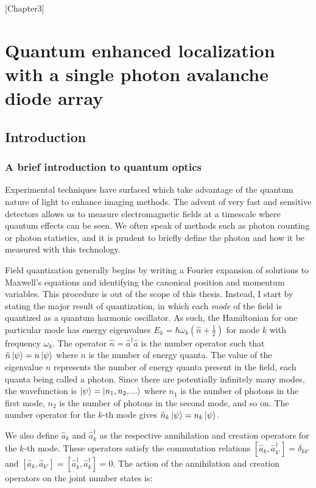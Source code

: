 [Chapter3]

\chapter{Quantum enhanced localization with a single photon avalanche diode array}

\section{Introduction}

\subsection{A brief introduction to quantum optics}

Experimental techniques have surfaced which take advantage of the quantum nature of light to enhance imaging methods. The advent of very fast and sensitive detectors allows us to measure electromagnetic fields at a timescale where quantum effects can be seen. We often speak of methods such as photon counting or photon statistics, and it is prudent to briefly define the photon and how it be measured with this technology.

Field quantization generally begins by writing a Fourier expansion of solutions to Maxwell's equations and identifying the canonical position and momentum variables. This procedure is out of the scope of this thesis. Instead, I start by stating the major result of quantization, in which each \emph{mode} of the field is quantized as a quantum harmonic oscillator. As such, the Hamiltonian for one particular mode has energy eigenvalues $E_{k} = \hbar\omega_{k}(\hat{n} + \frac{1}{2})$ for mode $k$ with frequency $\omega_{k}$. The operator $\hat{n}=\hat{a}^{\dagger}\hat{a}$ is the number operator such that $\hat{n}\ket{\psi} = n\ket{\psi}$ where $n$ is the number of energy quanta. The value of the eigenvalue $n$ represents the number of energy quanta present in the field, each quanta being called a photon. Since there are potentially infinitely many modes, the wavefunction is $\ket{\psi} = \ket{n_{1},n_{2},...}$ where $n_1$ is the number of photons in the first mode, $n_2$ is the number of photons in the second mode, and so on. The number operator for the $k$-th mode gives $\hat{n}_k\ket{\psi} = n_{k}\ket{\psi}$. 

We also define $\hat{a}_k$ and $\hat{a}_k^\dagger$ as the respective annihilation and creation operators for the $k$-th mode. These operators satisfy the commutation relations $[\hat{a}_k, \hat{a}_{k'}^\dagger] = \delta_{kk'}$ and $[\hat{a}_k, \hat{a}_{k'}] = [\hat{a}_k^\dagger, \hat{a}_k^\dagger] = 0$. The action of the annihilation and creation operators on the joint number states is:

